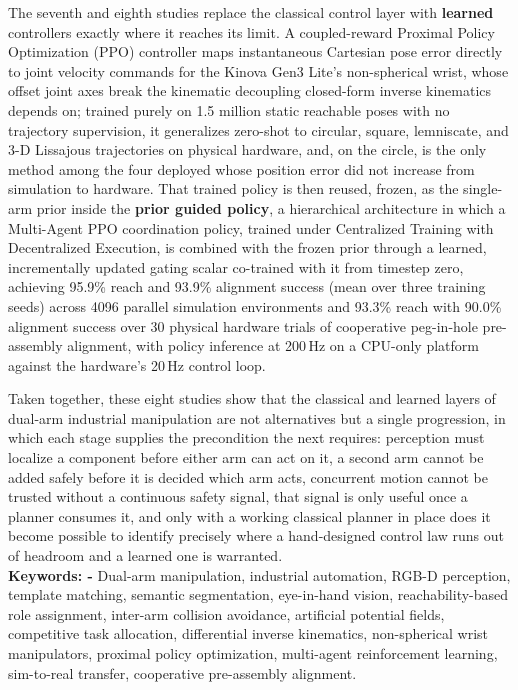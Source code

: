 \begin{Abstract}
The seventh and eighth studies replace the classical control layer with \textbf{learned}
controllers exactly where it reaches its limit. A coupled-reward Proximal Policy Optimization (PPO)
controller maps instantaneous Cartesian pose error directly to joint velocity commands for the
Kinova Gen3 Lite's non-spherical wrist, whose offset joint axes break the kinematic decoupling
closed-form inverse kinematics depends on; trained purely on 1.5 million static reachable poses with
no trajectory supervision, it generalizes zero-shot to circular, square, lemniscate, and 3-D
Lissajous trajectories on physical hardware, and, on the circle, is the only method among the
four deployed whose position error did not increase from simulation to hardware. That trained policy is then
reused, frozen, as the single-arm prior inside the \textbf{prior guided policy}, a hierarchical
architecture in which a Multi-Agent PPO coordination policy, trained under Centralized Training
with Decentralized Execution, is combined with the frozen prior through a learned, incrementally
updated gating scalar co-trained with it from timestep zero, achieving 95.9\% reach and 93.9\%
alignment success (mean over three training seeds) across 4096 parallel simulation environments and 93.3\% reach with 90.0\%
alignment success over 30 physical hardware trials of cooperative peg-in-hole pre-assembly
alignment, with policy inference at 200\,Hz on a CPU-only platform against the hardware's 20\,Hz
control loop.

Taken together, these eight studies show that the classical and learned layers of dual-arm
industrial manipulation are not alternatives but a single progression, in which each stage supplies
the precondition the next requires: perception must localize a component before either arm can act
on it, a second arm cannot be added safely before it is decided which arm acts, concurrent motion
cannot be trusted without a continuous safety signal, that signal is only useful once a planner
consumes it, and only with a working classical planner in place does it become possible to identify
precisely where a hand-designed control law runs out of headroom and a learned one is warranted.
\\
\textbf{Keywords: -} Dual-arm manipulation, industrial automation, RGB-D perception, template
matching, semantic segmentation, eye-in-hand vision, reachability-based role assignment,
inter-arm collision avoidance, artificial potential fields, competitive task
allocation, differential inverse kinematics, non-spherical wrist manipulators, proximal policy
optimization, multi-agent reinforcement learning, sim-to-real transfer, cooperative pre-assembly
alignment.
\end{Abstract}